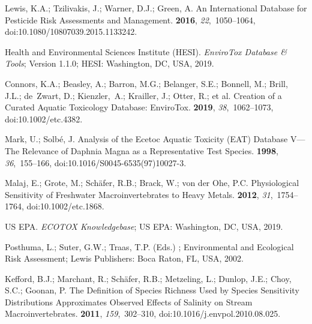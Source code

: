 \documentclass[data,datadescriptor,accept,moreauthors,pdftex]{Definitions/mdpi}
\begin{document}
\begin{thebibliography}{999}
Lewis, K.A.; Tzilivakis, J.; Warner, D.J.; Green, A.
\newblock An International Database for Pesticide Risk Assessments and
  Management.
  {\bf 2016}, {\em 22},~1050--1064, doi:10.1080/10807039.2015.1133242.

{Health and Environmental Sciences Institute (HESI)}.
\newblock \emph{{{EnviroTox Database}} \& {{Tools}}}; {{Version}} 1.1.0;  HESI: Washington, DC, USA, 2019.

Connors, K.A.; Beasley, A.; Barron, M.G.; Belanger, S.E.; Bonnell, M.; Brill,
  J.L.; {de~Zwart}, D.; Kienzler,~A.; Krailler, J.; Otter, R.; et al.
\newblock Creation of a {{Curated Aquatic Toxicology Database}}: {{EnviroTox}}.
 {\bf 2019}, {\em
  38},~1062--1073, doi:10.1002/etc.4382.

Mark, U.; Solb{\'e}, J.
\newblock Analysis of the Ecetoc Aquatic Toxicity ({{EAT}}) Database {{V}}---  {{The}} Relevance of {{Daphnia}} Magna as a Representative Test
  Species.
 {\bf 1998}, {\em 36},~155--166, doi:10.1016/S0045-6535(97)10027-3.

Malaj, E.; Grote, M.; Sch{\"a}fer, R.B.; Brack, W.; {von der Ohe}, P.C.
\newblock Physiological Sensitivity of Freshwater Macroinvertebrates to Heavy
  Metals.
 {\bf 2012}, {\em
  31},~1754--1764, doi:10.1002/etc.1868.

{US EPA}.
\newblock \emph{{ECOTOX Knowledgebase}};  US EPA: Washington, DC, USA, 2019.

Posthuma, L.; Suter, G.W.; Traas, T.P.  (Eds.)
;
  Environmental and Ecological Risk Assessment; {Lewis Publishers}: {Boca
  Raton, FL}, USA,  2002.

Kefford, B.J.; Marchant, R.; Sch{\"a}fer, R.B.; Metzeling, L.; Dunlop, J.E.;
  Choy, S.C.; Goonan, P.
\newblock The Definition of Species Richness Used by Species Sensitivity
  Distributions Approximates Observed Effects of Salinity on Stream
  Macroinvertebrates.
 {\bf 2011}, {\em 159},~302--310, doi:10.1016/j.envpol.2010.08.025.


\end{thebibliography}
\end{document}
